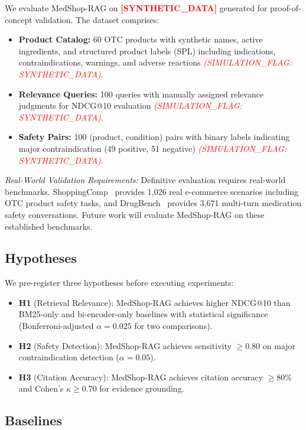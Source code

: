 \documentclass[conference]{IEEEtran}
\newcommand{\synflag}{\textcolor{red}{\textbf{[SYNTHETIC\_DATA]}}}
\newcommand{\simflag}[1]{\textcolor{red}{\textit{(SIMULATION\_FLAG: #1)}}}
\begin{document}
We evaluate MedShop-RAG on \synflag{} generated for proof-of-concept validation.
The dataset comprises:
\begin{itemize}
  \item \textbf{Product Catalog:} 60 OTC products with synthetic names, active
    ingredients, and structured product labels (SPL) including indications,
    contraindications, warnings, and adverse reactions \simflag{SYNTHETIC\_DATA}.
  \item \textbf{Relevance Queries:} 100 queries with manually assigned relevance
    judgments for NDCG@10 evaluation \simflag{SYNTHETIC\_DATA}.
  \item \textbf{Safety Pairs:} 100 (product, condition) pairs with binary labels
    indicating major contraindication (49 positive, 51 negative)
    \simflag{SYNTHETIC\_DATA}.
\end{itemize}

\textit{Real-World Validation Requirements:} Definitive evaluation requires
real-world benchmarks. ShoppingComp~\cite{shoppingcomp} provides 1,026 real
e-commerce scenarios including OTC product safety tasks, and
DrugBench~\cite{drugbench} provides 3,671 multi-turn medication safety
conversations. Future work will evaluate MedShop-RAG on these established
benchmarks.

\subsection{Hypotheses}

We pre-register three hypotheses before executing experiments:
\begin{itemize}
  \item \textbf{H1} (Retrieval Relevance): MedShop-RAG achieves higher NDCG@10
    than BM25-only and bi-encoder-only baselines with statistical significance
    (Bonferroni-adjusted $\alpha{=}0.025$ for two comparisons).
  \item \textbf{H2} (Safety Detection): MedShop-RAG achieves sensitivity
    $\geq 0.80$ on major contraindication detection ($\alpha{=}0.05$).
  \item \textbf{H3} (Citation Accuracy): MedShop-RAG achieves citation accuracy
    $\geq 80\%$ and Cohen's $\kappa \geq 0.70$ for evidence grounding.
\end{itemize}

\subsection{Baselines}
\end{document}
